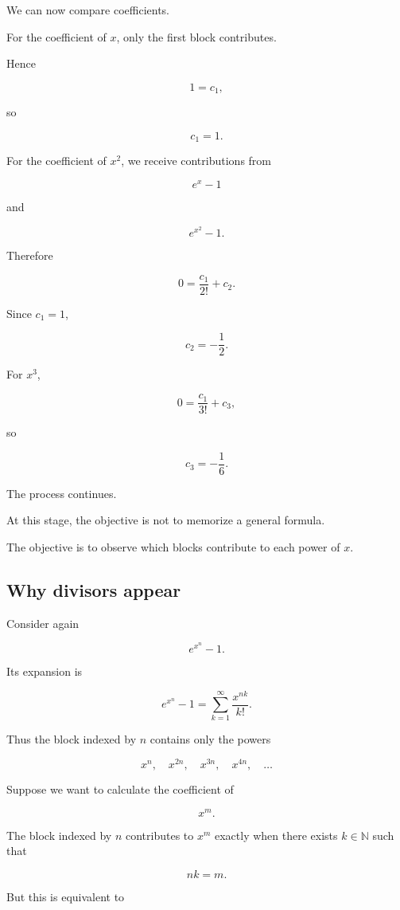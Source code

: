 We can now compare coefficients.

For the coefficient of \(x\), only the first block contributes.

Hence

\[
1=c_1,
\]

so

\[
\boxed{c_1=1.}
\]

For the coefficient of \(x^2\), we receive contributions from

\[
e^x-1
\]

and

\[
e^{x^2}-1.
\]

Therefore

\[
0=\frac{c_1}{2!}+c_2.
\]

Since \(c_1=1\),

\[
\boxed{
c_2=-\frac12.
}
\]

For \(x^3\),

\[
0=\frac{c_1}{3!}+c_3,
\]

so

\[
\boxed{
c_3=-\frac16.
}
\]

The process continues.

At this stage, the objective is not to memorize a general formula.

The objective is to observe which blocks contribute to each power of
\(x\).

\subsection{Why divisors appear}

Consider again

\[
e^{x^n}-1.
\]

Its expansion is

\[
e^{x^n}-1
=
\sum_{k=1}^{\infty}\frac{x^{nk}}{k!}.
\]

Thus the block indexed by \(n\) contains only the powers

\[
x^n,
\quad
x^{2n},
\quad
x^{3n},
\quad
x^{4n},
\quad
\ldots
\]

Suppose we want to calculate the coefficient of

\[
x^m.
\]

The block indexed by \(n\) contributes to \(x^m\) exactly when there exists
\(k\in\mathbb{N}\) such that

\[
nk=m.
\]

But this is equivalent to

